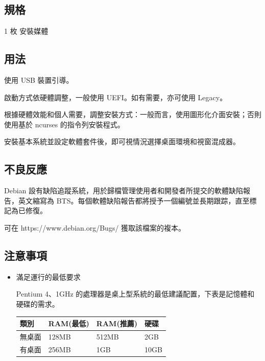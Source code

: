 \documentclass[UTF8]{article}
\begin{document}
\begin{multicols*}{3}
	\begin{tcolorbox}
	\section*{規格}
	\end{tcolorbox}

	1 枚 安裝媒體

	\medskip

	\begin{tcolorbox}
	\section*{用法}
	\end{tcolorbox}

	使用 USB 裝置引導。

	啟動方式依硬體調整，一般使用 UEFI。如有需要，亦可使用 Legacy。

	根據硬體效能和個人需要，調整安裝方式：一般而言，使用圖形化介面安裝；否則使用基於 ncurses 的指令列安裝程式。

	安裝基本系統並設定軟體套件後，即可視情況選擇桌面環境和視窗混成器。

	\medskip

	\begin{tcolorbox}
	\section*{不良反應}
	\end{tcolorbox}

	Debian 設有缺陷追蹤系統，用於歸檔管理使用者和開發者所提交的軟體缺陷報告，英文縮寫為 BTS。每個軟體缺陷報告都將授予一個編號並長期跟踪，直至標記為已修復。

	可在 https://www.debian.org/Bugs/ 獲取該檔案的複本。

	\medskip


	\begin{tcolorbox}
	\section*{注意事項}
	\end{tcolorbox}
	\begin{itemize}[leftmargin=*]

		\item 滿足運行的最低要求

		Pentium 4、1GHz 的處理器是桌上型系統的最低建議配置，下表是記憶體和硬碟的需求。

		{\small\begin{tabularx}{\linewidth}{|X|X|X|X|}
			\hline
			類別 & RAM\newline (最低) & RAM\newline (推薦) & 硬碟 \\
			\hline
			無桌面 & 128MB & 512MB & 2GB \\
			\hline
			有桌面 & 256MB & 1GB & 10GB \\
			\hline
		\end{tabularx}}


\end{itemize}
\end{multicols*}
\end{document}
